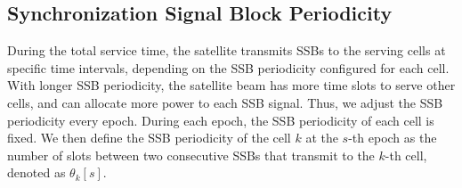 \subsection{Synchronization Signal Block Periodicity}

During the total service time, the satellite transmits SSBs to the serving cells at specific time intervals, depending on the SSB periodicity configured for each cell. With longer SSB periodicity, the satellite beam has more time slots to serve other cells, and can allocate more power to each SSB signal. Thus, we adjust the SSB periodicity every epoch. During each epoch, the SSB periodicity of each cell is fixed. We then define the SSB periodicity of the cell $k$ at the $s$-th epoch as the number of slots between two consecutive SSBs that transmit to the $k$-th cell, denoted as $\theta_k[s]$. 






